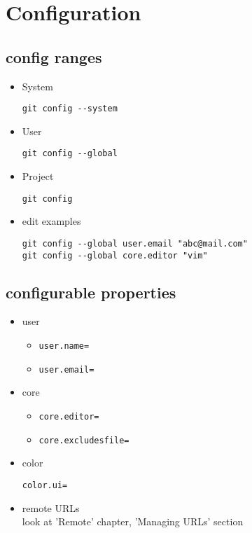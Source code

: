 \documentclass{report}
\begin{document}
\chapter{Configuration}
\section{config ranges}
\begin{itemize}
\item System
\begin{lstlisting}
git config --system
\end{lstlisting}

\item User
\begin{lstlisting}
git config --global
\end{lstlisting}

\item Project
\begin{lstlisting}
git config
\end{lstlisting}

\item edit examples
\begin{lstlisting}
git config --global user.email "abc@mail.com"
git config --global core.editor "vim"
\end{lstlisting}
\end{itemize}

\section{configurable properties}
\begin{itemize}

\item user
\begin{itemize}
\item \begin{verbatim}
user.name=
\end{verbatim}
\item \begin{verbatim}
user.email=
\end{verbatim}
\end{itemize}

\item core
\begin{itemize}
\item \begin{verbatim}
core.editor=
\end{verbatim}
\item \begin{verbatim}
core.excludesfile=
\end{verbatim}
\end{itemize}

\item color\begin{verbatim}
color.ui=
\end{verbatim}

\item remote URLs\\
look at 'Remote' chapter, 'Managing URLs' section

\end{itemize}
\end{document}
